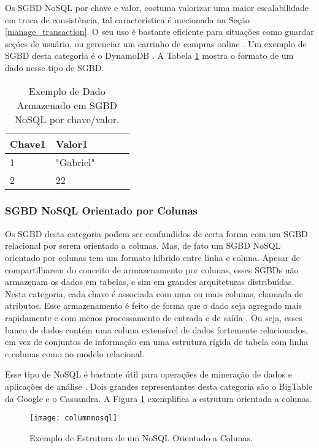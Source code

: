 	Os SGBD NoSQL por chave e valor, costuma valorizar uma maior escalabilidade em troca de consistência, tal característica é mecionada na Seção \ref{manage_transaction}. O seu uso é bastante eficiente para situações como guardar seções de usuário, ou gerenciar um carrinho de compras online \cite{nayak2013type}. Um exemplo de SGBD desta categoria é o DynamoDB \cite{DeCandia:2007:DAH:1323293.1294281}. A Tabela \ref{table:keyvalue} mostra o formato de um dado nesse tipo de SGBD.
	
\begin{table}[h!]
\centering
\caption{Exemplo de Dado Armazenado em SGBD NoSQL por chave/valor.}
\begin{tabular}{|l|l|l|l|l|}
\hline
Chave1 & Valor1 \\ \hline
1 & "Gabriel" \\ \hline
2 & 22 \\ \hline
\end{tabular}
\label{table:keyvalue}
\end{table}
	
\subsubsection{SGBD NoSQL Orientado por Colunas}
	Os SGBD desta categoria podem ser confundidos de certa forma com um SGBD relacional por serem orientado a colunas. Mas, de fato um SGBD NoSQL orientado por colunas tem um formato híbrido entre linha e coluna. Apesar de compartilharem do conceito de armazenamento por colunas, esses SGBDs não armazenam os dados em tabelas, e sim em grandes arquiteturas distribuídas. Nesta categoria, cada chave é associada com uma ou mais colunas, chamada de atributos. Esse armazenamento é feito de forma que o dado seja agregado mais rapidamente e com menos processamento de entrada e de saída \cite{nayak2013type}. Ou seja, esses banco de dados contém uma coluna extensível de dados fortemente relacionados, em vez de conjuntos de informação em uma estrutura rígida de tabela com linha e colunas como no modelo relacional\cite{kauremerging}. 
	
	Esse tipo de NoSQL é bastante útil para operações de mineração de dados e aplicações de análise \cite{nayak2013type}. Dois grandes representantes desta categoria são o BigTable da Google \cite{Chang:2008:BDS:1365815.1365816} e o Cassandra. A Figura \ref{fig:columnnosql} exemplifica a estrutura orientada a colunas.
	
\begin{figure}[H]
	\centering
    \texttt{[image: columnnosql]}
    \caption{Exemplo de Estrutura de um NoSQL Orientado a Colunas.}
    \label{fig:columnnosql}
\end{figure}
	
